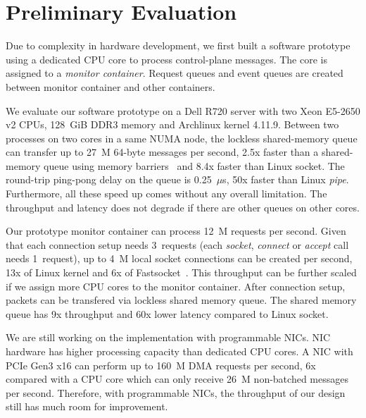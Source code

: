 \section{Preliminary Evaluation}
Due to complexity in hardware development, we first built a software prototype using a dedicated CPU core to process control-plane messages. The core is assigned to a \textit{monitor container}. Request queues and event queues are created between monitor container and other containers.

We evaluate our software prototype on a Dell R720 server with two Xeon E5-2650 v2 CPUs, 128~GiB DDR3 memory and Archlinux kernel 4.11.9.
Between two processes on two cores in a same NUMA node, the lockless shared-memory queue can transfer up to 27~M 64-byte messages per second, 2.5x faster than a shared-memory queue using memory barriers~\cite{ipc-bench} and 8.4x faster than Linux socket. The round-trip ping-pong delay on the queue is 0.25~$\mu$s, 50x faster than Linux \textit{pipe}. Furthermore, all these speed up comes without any overall limitation. The throughput and latency does not degrade if there are other queues on other cores.

Our prototype monitor container can process 12~M requests per second. Given that each connection setup needs 3~requests (each \textit{socket}, \textit{connect} or \textit{accept} call needs 1~request), up to 4~M local socket connections can be created per second, 13x of Linux kernel and 6x of Fastsocket~\cite{lin2016scalable}. This throughput can be further scaled if we assign more CPU cores to the monitor container. After connection setup, packets can be transfered via lockless shared memory queue. The shared memory queue has 9x throughput and 60x lower latency compared to Linux socket.

We are still working on the implementation with programmable NICs.
NIC hardware has higher processing capacity than dedicated CPU cores.
A NIC with PCIe Gen3 x16 can perform up to 160~M DMA requests per second, 6x compared with a CPU core which can only receive 26~M non-batched messages per second.
Therefore, with programmable NICs, the throughput of our design still has much room for improvement.